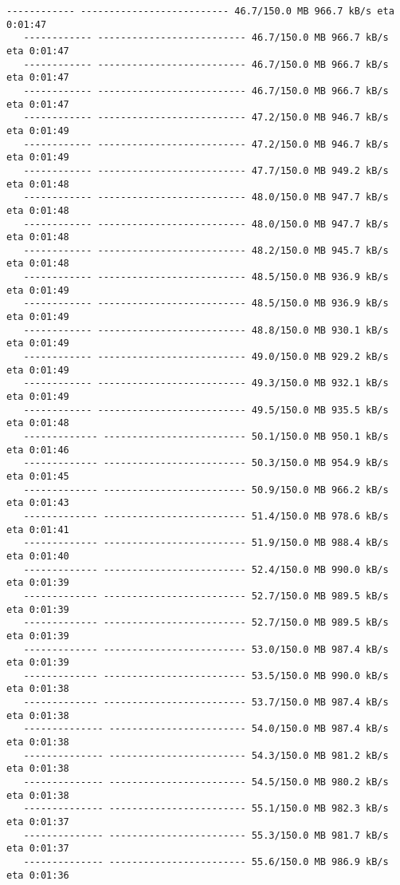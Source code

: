 \documentclass[11pt]{article}
\begin{document}
\begin{Verbatim}[commandchars=\\\{\}]
   ------------ -------------------------- 46.7/150.0 MB 966.7 kB/s eta 0:01:47
   ------------ -------------------------- 46.7/150.0 MB 966.7 kB/s eta 0:01:47
   ------------ -------------------------- 46.7/150.0 MB 966.7 kB/s eta 0:01:47
   ------------ -------------------------- 46.7/150.0 MB 966.7 kB/s eta 0:01:47
   ------------ -------------------------- 47.2/150.0 MB 946.7 kB/s eta 0:01:49
   ------------ -------------------------- 47.2/150.0 MB 946.7 kB/s eta 0:01:49
   ------------ -------------------------- 47.7/150.0 MB 949.2 kB/s eta 0:01:48
   ------------ -------------------------- 48.0/150.0 MB 947.7 kB/s eta 0:01:48
   ------------ -------------------------- 48.0/150.0 MB 947.7 kB/s eta 0:01:48
   ------------ -------------------------- 48.2/150.0 MB 945.7 kB/s eta 0:01:48
   ------------ -------------------------- 48.5/150.0 MB 936.9 kB/s eta 0:01:49
   ------------ -------------------------- 48.5/150.0 MB 936.9 kB/s eta 0:01:49
   ------------ -------------------------- 48.8/150.0 MB 930.1 kB/s eta 0:01:49
   ------------ -------------------------- 49.0/150.0 MB 929.2 kB/s eta 0:01:49
   ------------ -------------------------- 49.3/150.0 MB 932.1 kB/s eta 0:01:49
   ------------ -------------------------- 49.5/150.0 MB 935.5 kB/s eta 0:01:48
   ------------- ------------------------- 50.1/150.0 MB 950.1 kB/s eta 0:01:46
   ------------- ------------------------- 50.3/150.0 MB 954.9 kB/s eta 0:01:45
   ------------- ------------------------- 50.9/150.0 MB 966.2 kB/s eta 0:01:43
   ------------- ------------------------- 51.4/150.0 MB 978.6 kB/s eta 0:01:41
   ------------- ------------------------- 51.9/150.0 MB 988.4 kB/s eta 0:01:40
   ------------- ------------------------- 52.4/150.0 MB 990.0 kB/s eta 0:01:39
   ------------- ------------------------- 52.7/150.0 MB 989.5 kB/s eta 0:01:39
   ------------- ------------------------- 52.7/150.0 MB 989.5 kB/s eta 0:01:39
   ------------- ------------------------- 53.0/150.0 MB 987.4 kB/s eta 0:01:39
   ------------- ------------------------- 53.5/150.0 MB 990.0 kB/s eta 0:01:38
   ------------- ------------------------- 53.7/150.0 MB 987.4 kB/s eta 0:01:38
   -------------- ------------------------ 54.0/150.0 MB 987.4 kB/s eta 0:01:38
   -------------- ------------------------ 54.3/150.0 MB 981.2 kB/s eta 0:01:38
   -------------- ------------------------ 54.5/150.0 MB 980.2 kB/s eta 0:01:38
   -------------- ------------------------ 55.1/150.0 MB 982.3 kB/s eta 0:01:37
   -------------- ------------------------ 55.3/150.0 MB 981.7 kB/s eta 0:01:37
   -------------- ------------------------ 55.6/150.0 MB 986.9 kB/s eta 0:01:36

\end{Verbatim}
\end{document}
